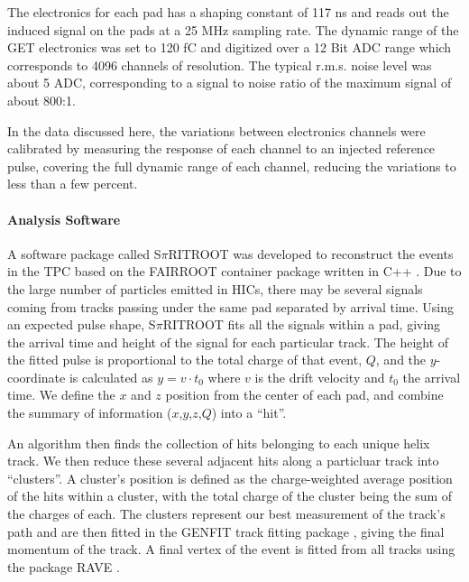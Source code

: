 \documentclass[review]{elsarticle}
\begin{document}
The electronics for each pad has a shaping constant of 117 ns and reads out the induced signal on the pads at a 25 MHz sampling rate. The dynamic range of the GET electronics was set to 120 fC and digitized over a 12 Bit ADC range which corresponds to 4096 channels of resolution. The typical r.m.s. noise level was about 5 ADC, corresponding to a signal to noise ratio of the maximum signal of about 800:1. 

In the data discussed here, the variations between electronics channels were calibrated by measuring the response of each channel to an injected reference pulse, covering the full dynamic range of each channel, reducing the variations to less than a few percent.
 
\paragraph{Analysis Software}
A software package called S$\pi$RITROOT was developed to reconstruct the events in the TPC based on the FAIRROOT container package written in C++ \cite{fairroot}. Due to the large number of particles emitted in HICs, there may be several signals coming from tracks passing under the same pad separated by arrival time. Using an expected pulse shape, S$\pi$RITROOT fits all the signals within a pad, giving the arrival time and height of the signal for each particular track. The height of the fitted pulse is proportional to the total charge of that event, $Q$, and the $y$-coordinate is calculated as $y = v\cdot t_0$ where $v$ is the drift velocity and $t_0$ the arrival time. We define the $x$ and $z$ position from the center of each pad, and combine the summary of information ($x$,$y$,$z$,$Q$) into a ``hit''. 

 An algorithm then finds the collection of hits belonging to each unique helix track. We then reduce these several adjacent hits along a particluar track into ``clusters''. A cluster's position is defined as the charge-weighted average position of the hits within a cluster, with the total charge of the cluster being the sum of the charges of each. The clusters represent our best measurement of the track's path and are then fitted in the GENFIT track fitting package \cite{genfit}, giving the final momentum of the track. A final vertex of the event is fitted from all tracks using the package RAVE \cite{rave}. 
 
\end{document}

